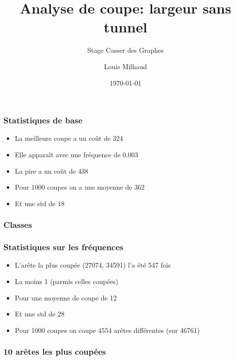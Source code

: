 \documentclass[aspectratio=169]{beamer}
\title{Analyse de coupe: largeur sans tunnel}
\subtitle{Stage Casser des Graphes}
\author{Louis Milhaud}
\institute{Complex Networks - LIP6}
\date{\today}
\begin{document}
    \begin{frame}
        \titlepage
    \end{frame}

    \begin{frame}
        \frametitle{Statistiques de base}
        
        \begin{itemize}
            \item La meilleure coupe a un coût de 324
            \item Elle apparaît avec une fréquence de 0.003
            \item La pire a un coût de 438
            \item Pour 1000 coupes on a une moyenne de 362
            \item Et une std de 18
        \end{itemize}
    
    \end{frame}

    \begin{frame}
        \frametitle{Classes}
    
        
    
    \end{frame}

    \begin{frame}
        \frametitle{Statistiques sur les fréquences}

        \begin{itemize}
            \item L'arête la plus coupée (27074, 34591) l'a été 547 fois
            \item La moins 1 (parmis celles coupées)
            \item Pour une moyenne de coupe de 12
            \item Et une std de 28
            \item Pour 1000 coupes on coupe 4554 arêtes différentes (sur 46761)
        \end{itemize}
    
    \end{frame}

    \begin{frame}
        \frametitle{10 arêtes les plus coupées}
    
        
    
    \end{frame}
\end{document}
